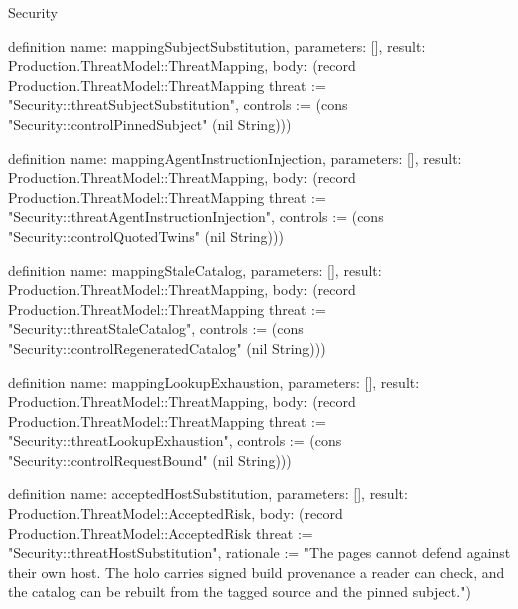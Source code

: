 \begin{lexlean}{Security}
\begin{semanticmodule}
definition{
  name: mappingSubjectSubstitution,
  parameters: [],
  result: Production.ThreatModel::ThreatMapping,
  body: (record Production.ThreatModel::ThreatMapping {threat := "Security::threatSubjectSubstitution", controls := (cons "Security::controlPinnedSubject" (nil String))})
}

definition{
  name: mappingAgentInstructionInjection,
  parameters: [],
  result: Production.ThreatModel::ThreatMapping,
  body: (record Production.ThreatModel::ThreatMapping {threat := "Security::threatAgentInstructionInjection", controls := (cons "Security::controlQuotedTwins" (nil String))})
}

definition{
  name: mappingStaleCatalog,
  parameters: [],
  result: Production.ThreatModel::ThreatMapping,
  body: (record Production.ThreatModel::ThreatMapping {threat := "Security::threatStaleCatalog", controls := (cons "Security::controlRegeneratedCatalog" (nil String))})
}

definition{
  name: mappingLookupExhaustion,
  parameters: [],
  result: Production.ThreatModel::ThreatMapping,
  body: (record Production.ThreatModel::ThreatMapping {threat := "Security::threatLookupExhaustion", controls := (cons "Security::controlRequestBound" (nil String))})
}

definition{
  name: acceptedHostSubstitution,
  parameters: [],
  result: Production.ThreatModel::AcceptedRisk,
  body: (record Production.ThreatModel::AcceptedRisk {threat := "Security::threatHostSubstitution", rationale := "The pages cannot defend against their own host. The holo carries signed build provenance a reader can check, and the catalog can be rebuilt from the tagged source and the pinned subject."})
}
\end{semanticmodule}
\end{lexlean}

